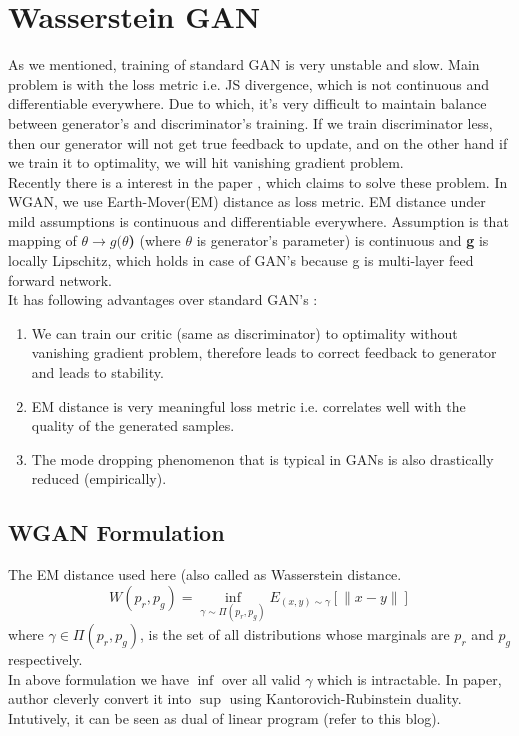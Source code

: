\documentclass{article}
\begin{document}
\section{Wasserstein GAN }
As we mentioned, training of standard GAN is very unstable and slow. Main problem is with the loss metric i.e. JS divergence, which is not continuous and differentiable everywhere. Due to which, it's very difficult to maintain balance between generator's and discriminator's training. If we train discriminator less, then our generator will not get true feedback to update, and on the other hand if we train it to optimality, we will hit vanishing gradient problem.\\
Recently there is a interest in the paper \cite{wgan}, which claims to solve these problem. In WGAN, we use Earth-Mover(EM) distance as loss metric. EM distance under mild assumptions is continuous and differentiable everywhere. Assumption is that mapping of \textbf{$\theta \rightarrow g(\theta$)} (where $\theta$ is generator's parameter) is continuous and \textbf{g} is locally Lipschitz, which holds in case of GAN's because g is multi-layer feed forward network.\\
It has following advantages over standard GAN's : 
\begin{enumerate}
\item We can train our critic (same as discriminator) to optimality without vanishing gradient problem, therefore leads to correct feedback to generator and leads to stability.
\item EM distance is very meaningful loss metric i.e. correlates well with the quality of the generated samples.
\item The  mode dropping phenomenon that is typical in GANs is also  drastically reduced (empirically).
\end{enumerate}


\subsection{WGAN Formulation}
The EM distance used here (also called as Wasserstein distance.
\[
W(p_r, p_g) = \inf_{\gamma \sim \Pi(p_r, p_g)} E_{(x, y) \sim \gamma}[\| x-y \|]
\]
where $\gamma \in \Pi(p_r, p_g)$, is the set of all distributions whose marginals are $p_r$ and $p_g$ respectively.\\

In above formulation we have $\inf$ over all valid $\gamma$ which is intractable. In paper, author cleverly convert it into $\sup$ using Kantorovich-Rubinstein duality. Intutively, it can be seen as dual of linear program (refer to this blog).\\
\end{document}
